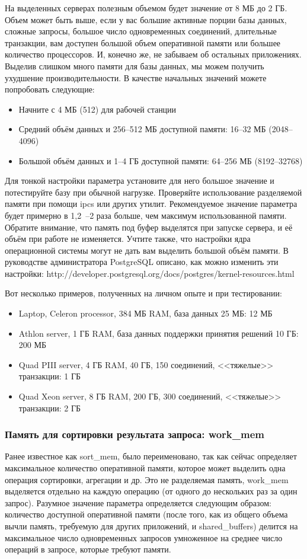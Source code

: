 На выделенных серверах полезным объемом будет значение от 8 МБ до 2 ГБ. 
Объем может быть выше, если у вас большие активные порции базы данных, сложные запросы, большое число 
одновременных соединений, длительные транзакции, вам доступен большой объем оперативной памяти или большее количество 
процессоров. И, конечно же, не забываем об остальных приложениях. Выделив слишком много памяти для базы данных, 
мы можем получить ухудшение производительности. 
В качестве начальных значений можете попробовать следующие:
\begin{itemize}
\item Начните с 4 МБ (512) для рабочей станции
\item Средний объём данных и 256--512 МБ доступной памяти: 16--32 МБ (2048--4096)
\item Большой объём данных и 1--4 ГБ доступной памяти: 64--256 МБ (8192--32768)
\end{itemize}

Для тонкой настройки параметра установите для него большое значение и потестируйте базу при обычной нагрузке. 
Проверяйте использование разделяемой памяти при помощи ipcs или других утилит. Рекомендуемое значение параметра 
будет примерно в 1,2~--2 раза больше, чем максимум использованной памяти. Обратите внимание, что память под буфер 
выделятся при запуске сервера, и её объём при работе не изменяется. Учтите также, что настройки ядра операционной 
системы могут не дать вам выделить большой объём памяти. В руководстве администратора PostgreSQL описано, как 
можно изменить эти настройки: http://developer.postgresql.org/docs/postgres/kernel-resources.html

Вот несколько примеров, полученных на личном опыте и при тестировании:
\begin{itemize}
\item Laptop, Celeron processor, 384 МБ RAM, база данных 25 МБ: 12 МБ
\item Athlon server, 1 ГБ RAM, база данных поддержки принятия решений 10 ГБ: 200 МБ
\item Quad PIII server, 4 ГБ RAM, 40 ГБ, 150 соединений, <<тяжелые>> транзакции: 1 ГБ
\item Quad Xeon server, 8 ГБ RAM, 200 ГБ, 300 соединений, <<тяжелые>> транзакции: 2 ГБ
\end{itemize}

\subsubsection{Память для сортировки результата запроса: work\_mem}
Ранее известное как sort\_mem, было переименовано, так как сейчас определяет максимальное количество оперативной памяти, 
которое может выделить одна операция сортировки, агрегации и др. Это не разделяемая память, work\_mem выделяется отдельно 
на каждую операцию (от одного до нескольких раз за один запрос). Разумное значение параметра определяется следующим образом: 
количество доступной оперативной памяти (после того, как из общего объема вычли память, требуемую для других приложений, и 
shared\_buffers) делится на максимальное число одновременных запросов умноженное на среднее число операций в запросе, которые 
требуют памяти.

